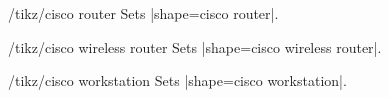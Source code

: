 \documentclass[a4paper]{ltxdoc}
\begin{document}
\begin{stylekey}{/tikz/cisco router}
Sets |shape={cisco router}|.
\begin{codeexample}[preamble={\usetikzlibrary{shapes.cisco.router}}]
\end{codeexample}
\end{stylekey}

\begin{stylekey}{/tikz/cisco wireless router}
Sets |shape={cisco wireless router}|.
\begin{codeexample}[preamble={\usetikzlibrary{shapes.cisco.wirelessrouter}}]
\end{codeexample}
\end{stylekey}

\begin{stylekey}{/tikz/cisco workstation}
Sets |shape={cisco workstation}|.
\begin{codeexample}[preamble={\usetikzlibrary{shapes.cisco.workstation}}]
\end{codeexample}
\end{stylekey}
\end{document}
